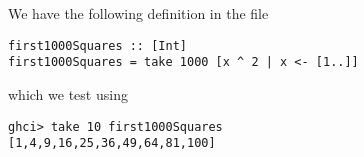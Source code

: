 
We have the following definition in the file 
\scriptsize\begin{verbatim}
first1000Squares :: [Int]
first1000Squares = take 1000 [x ^ 2 | x <- [1..]]
\end{verbatim}\normalsize
which we test using
\scriptsize\begin{verbatim}
ghci> take 10 first1000Squares
[1,4,9,16,25,36,49,64,81,100]
\end{verbatim}\normalsize
